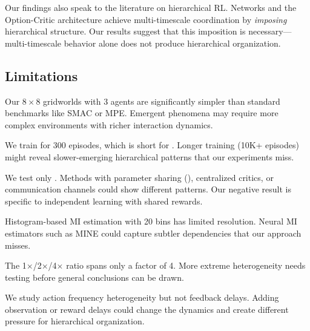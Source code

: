 Our findings also speak to the literature on hierarchical RL. \feudal Networks \citep{vezhnevets2017feudal} and the Option-Critic architecture \citep{bacon2017option} achieve multi-timescale coordination by \emph{imposing} hierarchical structure. Our results suggest that this imposition is necessary---multi-timescale behavior alone does not produce hierarchical organization.

\subsection{Limitations}
\label{sec:limitations}

 Our $8 \times 8$ gridworlds with 3 agents are significantly simpler than standard \marl benchmarks like SMAC or MPE. Emergent phenomena may require more complex environments with richer interaction dynamics.

 We train for 300 episodes, which is short for \marl. Longer training (10K+ episodes) might reveal slower-emerging hierarchical patterns that our experiments miss.

 We test only \ippo. Methods with parameter sharing (\mappo), centralized critics, or communication channels could show different patterns. Our negative result is specific to independent learning with shared rewards.

 Histogram-based MI estimation with 20 bins has limited resolution. Neural MI estimators such as MINE \citep{belghazi2018mine} could capture subtler dependencies that our approach misses.

 The 1$\times$/2$\times$/4$\times$ ratio spans only a factor of 4. More extreme heterogeneity needs testing before general conclusions can be drawn.

 We study action frequency heterogeneity but not feedback delays. Adding observation or reward delays could change the dynamics and create different pressure for hierarchical organization.
